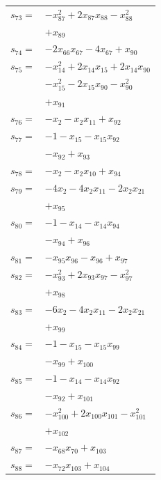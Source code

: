 \begin{longtable}{@{}r@{\;}l@{}}
\(s_{73}=\) & \(\displaystyle -x_{87}^{2} +2x_{87}x_{88} -x_{88}^{2}\) \\
 & \(\displaystyle +x_{89}\) \\[3pt]
\(s_{74}=\) & \(\displaystyle -2x_{66}x_{67} -4x_{67} +x_{90}\) \\[3pt]
\(s_{75}=\) & \(\displaystyle -x_{14}^{2} +2x_{14}x_{15} +2x_{14}x_{90}\) \\
 & \(\displaystyle -x_{15}^{2} -2x_{15}x_{90} -x_{90}^{2}\) \\
 & \(\displaystyle +x_{91}\) \\[3pt]
\(s_{76}=\) & \(\displaystyle -x_{2} -x_{2}x_{11} +x_{92}\) \\[3pt]
\(s_{77}=\) & \(\displaystyle -1 -x_{15} -x_{15}x_{92}\) \\
 & \(\displaystyle -x_{92} +x_{93}\) \\[3pt]
\(s_{78}=\) & \(\displaystyle -x_{2} -x_{2}x_{10} +x_{94}\) \\[3pt]
\(s_{79}=\) & \(\displaystyle -4x_{2} -4x_{2}x_{11} -2x_{2}x_{21}\) \\
 & \(\displaystyle +x_{95}\) \\[3pt]
\(s_{80}=\) & \(\displaystyle -1 -x_{14} -x_{14}x_{94}\) \\
 & \(\displaystyle -x_{94} +x_{96}\) \\[3pt]
\(s_{81}=\) & \(\displaystyle -x_{95}x_{96} -x_{96} +x_{97}\) \\[3pt]
\(s_{82}=\) & \(\displaystyle -x_{93}^{2} +2x_{93}x_{97} -x_{97}^{2}\) \\
 & \(\displaystyle +x_{98}\) \\[3pt]
\(s_{83}=\) & \(\displaystyle -6x_{2} -4x_{2}x_{11} -2x_{2}x_{21}\) \\
 & \(\displaystyle +x_{99}\) \\[3pt]
\(s_{84}=\) & \(\displaystyle -1 -x_{15} -x_{15}x_{99}\) \\
 & \(\displaystyle -x_{99} +x_{100}\) \\[3pt]
\(s_{85}=\) & \(\displaystyle -1 -x_{14} -x_{14}x_{92}\) \\
 & \(\displaystyle -x_{92} +x_{101}\) \\[3pt]
\(s_{86}=\) & \(\displaystyle -x_{100}^{2} +2x_{100}x_{101} -x_{101}^{2}\) \\
 & \(\displaystyle +x_{102}\) \\[3pt]
\(s_{87}=\) & \(\displaystyle -x_{68}x_{70} +x_{103}\) \\[3pt]
\(s_{88}=\) & \(\displaystyle -x_{72}x_{103} +x_{104}\) \\[3pt]

\end{longtable}

